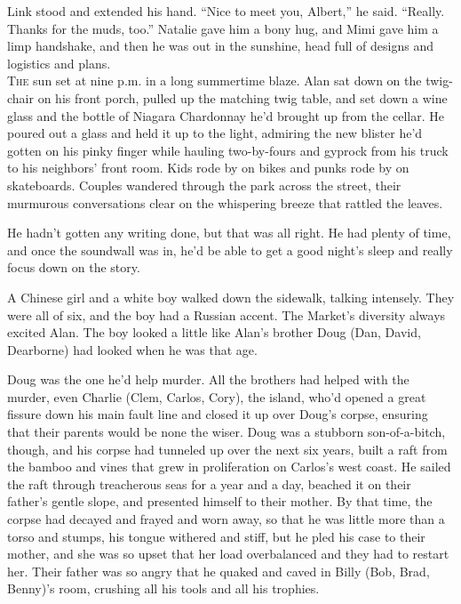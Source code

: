 Link stood and extended his hand.  ``Nice to meet you, Albert,'' he
said.  ``Really.  Thanks for the muds, too.'' Natalie gave him a bony
hug, and Mimi gave him a limp handshake, and then he was out in the
sunshine, head full of designs and logistics and plans.
\\
\lettrine[lines=3, lhang=.5, nindent=0pt, findent=2pt]{T}{he} sun set at nine p.m.  in a long summertime blaze.  Alan sat down
on the twig-chair on his front porch, pulled up the matching twig
table, and set down a wine glass and the bottle of Niagara Chardonnay
he'd brought up from the cellar.  He poured out a glass and held it up
to the light, admiring the new blister he'd gotten on his pinky finger
while hauling two-by-fours and gyprock from his truck to his
neighbors' front room.  Kids rode by on bikes and punks rode by on
skateboards.  Couples wandered through the park across the street,
their murmurous conversations clear on the whispering breeze that
rattled the leaves.

He hadn't gotten any writing done, but that was all right.  He had
plenty of time, and once the soundwall was in, he'd be able to get a
good night's sleep and really focus down on the story.

A Chinese girl and a white boy walked down the sidewalk, talking
intensely.  They were all of six, and the boy had a Russian accent. 
The Market's diversity always excited Alan.  The boy looked a little
like Alan's brother Doug (Dan, David, Dearborne) had looked when he
was that age.

Doug was the one he'd help murder.  All the brothers had helped with
the murder, even Charlie (Clem, Carlos, Cory), the island, who'd
opened a great fissure down his main fault line and closed it up over
Doug's corpse, ensuring that their parents would be none the wiser. 
Doug was a stubborn son-of-a-bitch, though, and his corpse had
tunneled up over the next six years, built a raft from the bamboo and
vines that grew in proliferation on Carlos's west coast.  He sailed
the raft through treacherous seas for a year and a day, beached it on
their father's gentle slope, and presented himself to their mother. 
By that time, the corpse had decayed and frayed and worn away, so that
he was little more than a torso and stumps, his tongue withered and
stiff, but he pled his case to their mother, and she was so upset that
her load overbalanced and they had to restart her.  Their father was
so angry that he quaked and caved in Billy (Bob, Brad, Benny)'s room,
crushing all his tools and all his trophies.

